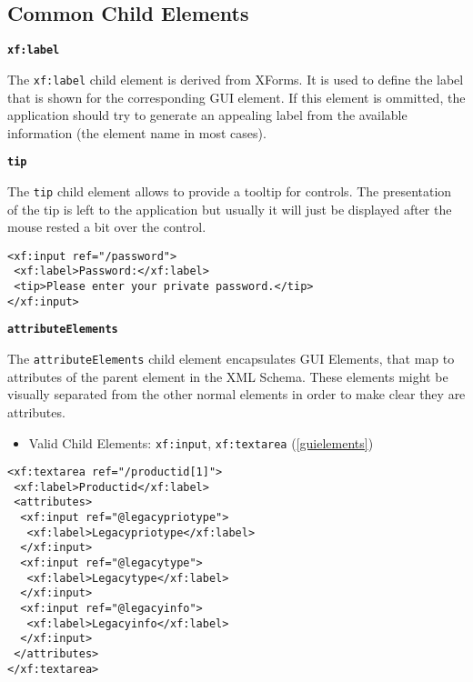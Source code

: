\subsection{ Common Child Elements}
\label{commonchildelements}
\begin{description}
 \item \textbf{\texttt{xf:label}} 

The \texttt{xf:label} child element is derived from XForms. It is used to define the label that is shown for the corresponding GUI element. If this element is ommitted, the application should try to generate an appealing label from the available information (the element name in most cases).


 \item \textbf{\texttt{tip}} 

The \texttt{tip} child element allows to provide a tooltip for controls. The presentation of the tip is left to the application but usually it will just be displayed after the mouse rested a bit over the control.

\begin{lstlisting}[caption=\texttt{xf:label} and \texttt{tip} element]
<xf:input ref="/password">
 <xf:label>Password:</xf:label>
 <tip>Please enter your private password.</tip>
</xf:input>
\end{lstlisting}


 \item \textbf{\texttt{attributeElements}}

The \texttt{attributeElements} child element encapsulates GUI Elements, that map to attributes of the parent element in the XML Schema. These elements might be visually separated from the other normal elements in order to make clear they are attributes.

\begin{itemize}
 \item Valid Child Elements: \texttt{xf:input}, \texttt{xf:textarea} (\ref{guielements})
\end{itemize}

\begin{lstlisting}[caption=\texttt{attributeElements} element]
<xf:textarea ref="/productid[1]">
 <xf:label>Productid</xf:label>
 <attributes>
  <xf:input ref="@legacypriotype">
   <xf:label>Legacypriotype</xf:label>
  </xf:input>
  <xf:input ref="@legacytype">
   <xf:label>Legacytype</xf:label>
  </xf:input>
  <xf:input ref="@legacyinfo">
   <xf:label>Legacyinfo</xf:label>
  </xf:input>
 </attributes>
</xf:textarea>

\end{lstlisting}

\end{description}






